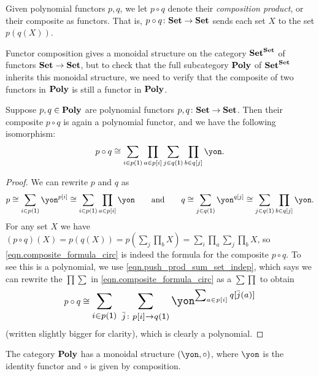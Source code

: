 \documentclass[Book-Poly]{subfiles}
\begin{document}
\begin{definition} \label{def.comp}
Given polynomial functors $p, q$, we let $p \circ q$ denote their \emph{composition product}, or their composite as functors.
That is, $p \circ q \colon \mathbf{Set} \to \mathbf{Set}$ sends each set $X$ to the set $p(q(X))$.
\end{definition}

Functor composition gives a monoidal structure on the category $\mathbf{Set}^{\mathbf{Set}}$ of functors $\mathbf{Set}\to\mathbf{Set}$, but to check that the full subcategory $\mathbf{Poly}$ of $\mathbf{Set}^{\mathbf{Set}}$ inherits this monoidal structure, we need to verify that the composite of two functors in $\mathbf{Poly}$ is still a functor in $\mathbf{Poly}$.

\begin{proposition}\label{prop.poly_closed_comp}
Suppose $p,q\in\mathbf{Poly}$ are polynomial functors $p,q\colon\mathbf{Set}\to\mathbf{Set}$. Then their composite $p\circ q$ is again a polynomial functor, and we have the following isomorphism:
\begin{equation} \label{eqn.composite_formula_circ}
p\circ q\iso\sum_{i\in p(\1)}\prod_{a\in p[i]}\sum_{j\in q(\1)}\prod_{b\in q[j]}\yon.
\end{equation}
\end{proposition}
\begin{proof}
We can rewrite $p$ and $q$ as
\[
p\iso\sum_{i\in p(\1)}\yon^{p[i]}\iso\sum_{i\in p(\1)}\prod_{a\in p[i]}\yon
\qqand
q\iso\sum_{j\in q(\1)}\yon^{q[j]}\iso\sum_{j\in q(\1)}\prod_{b\in q[j]}\yon.
\]
For any set $X$ we have $(p\circ q)(X)=p(q(X))=p(\sum_j\prod_b X)=\sum_i\prod_a\sum_j\prod_bX$, so \eqref{eqn.composite_formula_circ} is indeed the formula for the composite $p \circ q$.
To see this is a polynomial, we use \eqref{eqn.push_prod_sum_set_indep}, which says we can rewrite the $\prod\sum$ in \eqref{eqn.composite_formula_circ} as a $\sum\prod$ to obtain
\begin{align}\label{eqn.composite_formula_sums_first_circ}
  p\circ q\iso
  \scalebox{1.3}{$\displaystyle
  \sum_{i\in p(\1)} \; \sum_{\bar{j}\colon p[i]\to q(\1)}\yon^{\sum_{a\in p[i]}q[\bar{j}(a)]}$}
\end{align}
(written slightly bigger for clarity), which is clearly a polynomial.
\end{proof}

\begin{corollary} \label{cor.comp_monoidal}
The category $\mathbf{Poly}$ has a monoidal structure $(\yon,\circ)$, where $\yon$ is the identity functor and $\circ$ is given by composition.
\end{corollary}
\end{document}
